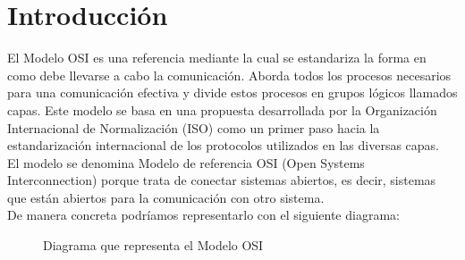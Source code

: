 \section{Introducción}
El Modelo OSI es una referencia mediante la cual se estandariza la forma en como debe llevarse a cabo la comunicación. Aborda todos los procesos necesarios para una comunicación efectiva y divide estos procesos en grupos lógicos llamados capas. 
Este modelo se basa en una propuesta desarrollada por la Organización Internacional de Normalización (ISO) como un primer paso hacia la estandarización internacional de los protocolos utilizados en las diversas capas.
\\${ }$\\
El modelo se denomina Modelo de referencia OSI (Open Systems Interconnection) porque trata de conectar sistemas abiertos, es decir, sistemas que están abiertos para la comunicación con otro sistema. 
\\ ${ }$\\
De manera concreta podríamos representarlo con el siguiente diagrama:
\begin{figure}[!ht]
\centering
{}
\caption{Diagrama que representa el Modelo OSI}
\end{figure}
\\
